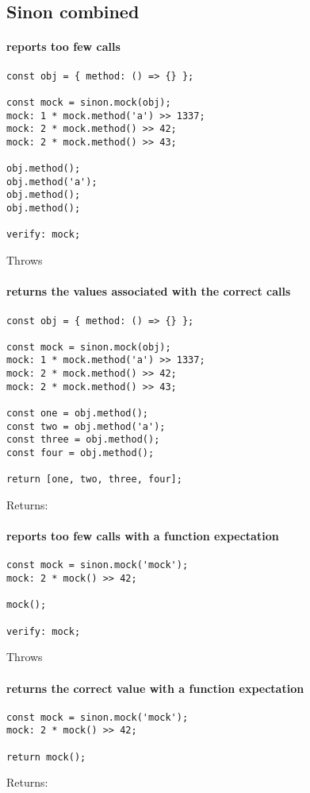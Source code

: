 \subsection*{Sinon combined}

\paragraph*{reports too few calls}
\begin{verbatim}
const obj = { method: () => {} };

const mock = sinon.mock(obj);
mock: 1 * mock.method('a') >> 1337;
mock: 2 * mock.method() >> 42;
mock: 2 * mock.method() >> 43;

obj.method();
obj.method('a');
obj.method();
obj.method();

verify: mock;
\end{verbatim}
Throws
\paragraph*{returns the values associated with the correct calls}
\begin{verbatim}
const obj = { method: () => {} };

const mock = sinon.mock(obj);
mock: 1 * mock.method('a') >> 1337;
mock: 2 * mock.method() >> 42;
mock: 2 * mock.method() >> 43;

const one = obj.method();
const two = obj.method('a');
const three = obj.method();
const four = obj.method();

return [one, two, three, four];
\end{verbatim}
Returns: \code{[42, 1337, 42, 43]}
\paragraph*{reports too few calls with a function expectation}
\begin{verbatim}
const mock = sinon.mock('mock');
mock: 2 * mock() >> 42;

mock();

verify: mock;
\end{verbatim}
Throws
\paragraph*{returns the correct value with a function expectation}
\begin{verbatim}
const mock = sinon.mock('mock');
mock: 2 * mock() >> 42;

return mock();
\end{verbatim}
Returns: 

